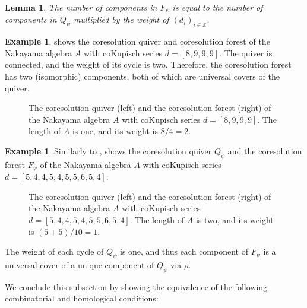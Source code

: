 \documentclass[a4paper]{amsart}
\newtheorem{lemma}[theorem]{Lemma}
\theoremstyle{definition}
\newtheorem{example}[theorem]{Example}
\theoremstyle{remark}
\numberwithin{equation}{theorem}
\newcommand{\Z}{\mathbb{Z}}
\newcommand{\psiforest}{F_\psi}
\newcommand{\psiquiver}{Q_\psi}
\begin{document}
  \begin{lemma}\label{rem:weight}
      The number of components in $ \psiforest $ is equal to the number of components in $ \psiquiver $ multiplied by the weight of $(d_i)_{i\in\Z}$.
  \end{lemma}



\begin{example}\label{ex:fig.2}
   shows the coresolution quiver and
  coresolution forest of the Nakayama algebra $ A $ with coKupisch series
  $d = [8,9,9,9]$.  The quiver is connected, and the weight of its
  cycle is two. Therefore, the coresolution forest has two (isomorphic) components, both
  of which are universal covers of the quiver.
    \begin{figure}[t]
      \centering
      
      \caption{The coresolution quiver (left) and the coresolution forest (right) of the Nakayama algebra $ A $ with coKupisch series $ d = [8,9,9,9]$. The length of $ A $ is one, and its weight is $ 8 / 4=2 $.}
      \label{fig:coresforest-8999}
    \end{figure}
\end{example}

\begin{example}
  Similarly to ,  shows the coresolution quiver $ \psiquiver $ and the coresolution forest $ \psiforest $ of the Nakayama algebra $ A $ with coKupisch series $d = [5,4,4,5,4,5,5, \allowbreak 6,5,4]$.
    \begin{figure}[t]
        \centering
        
        \caption{The coresolution quiver (left) and the coresolution forest (right) of the Nakayama algebra $ A $ with coKupisch series $ d = [5,4,4,5,4,5,5,6,5,4]$. The length of $ A $ is two, and its weight is $ ( 5 + 5 ) / 10 = 1 $.}
        \label{fig:coresforest-5445455654}
    \end{figure}
  The weight of each cycle of $ \psiquiver $ is one, and thus each component of $ \psiforest $ is a universal cover of a unique component of $ \psiquiver $ via $ \rho $.
\end{example}

We conclude this subsection by showing the equivalence of the following combinatorial and homological conditions:
\end{document}
